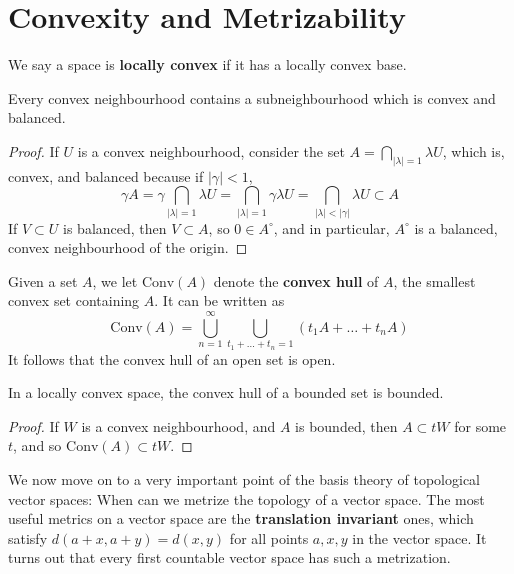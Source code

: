 \section{Convexity and Metrizability}

We say a space is {\bf locally convex} if it has a locally convex base.

\begin{theorem}
    Every convex neighbourhood contains a subneighbourhood which is convex and balanced.
\end{theorem}
\begin{proof}
    If $U$ is a convex neighbourhood, consider the set $A = \bigcap_{|\lambda| = 1} \lambda U$, which is, convex, and balanced because if $|\gamma| < 1$,
    \[ \gamma A = \gamma \bigcap_{|\lambda| = 1} \lambda U = \bigcap_{|\lambda| = 1} \gamma \lambda U = \bigcap_{|\lambda| < |\gamma|} \lambda U \subset A \]
    If $V \subset U$ is balanced, then $V \subset A$, so $0 \in A^\circ$, and in particular, $A^\circ$ is a balanced, convex neighbourhood of the origin.
\end{proof}

Given a set $A$, we let $\text{Conv}(A)$ denote the {\bf convex hull} of $A$, the smallest convex set containing $A$. It can be written as
%
\[ \text{Conv}(A) = \bigcup_{n = 1}^\infty \bigcup_{t_1 + \dots + t_n = 1} (t_1A + \dots + t_nA) \]
%
It follows that the convex hull of an open set is open.

\begin{theorem}
    In a locally convex space, the convex hull of a bounded set is bounded.
\end{theorem}
\begin{proof}
    If $W$ is a convex neighbourhood, and $A$ is bounded, then $A \subset tW$ for some $t$, and so $\text{Conv}(A) \subset tW$.
\end{proof}

We now move on to a very important point of the basis theory of topological vector spaces: When can we metrize the topology of a vector space. The most useful metrics on a vector space are the {\bf translation invariant} ones, which satisfy $d(a + x, a + y) = d(x,y)$ for all points $a,x,y$ in the vector space. It turns out that every first countable vector space has such a metrization.

